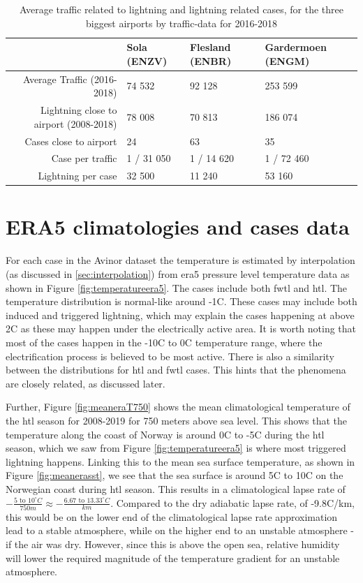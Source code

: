\begin{table}
        \begin{tabular}{r|l|l|l|}
            & Sola (ENZV) & Flesland (ENBR) & Gardermoen (ENGM) \\\hline
            Average Traffic (2016-2018)  & 74 532 & 92 128 & 253 599   \\\hline
            Lightning close to airport (2008-2018) & 78 008 & 70 813   & 186 074 \\\hline
            Cases close to airport & 24 & 63  & 35 \\\hline
            Case per traffic & 1 / 31 050 & 1 / 14 620 & 1 / 72 460\\\hline
            Lightning per case & 32 500 & 11 240 & 53 160 \\\hline
        \end{tabular}
     \caption{Average traffic related to lightning and lightning related cases, for the three biggest airports by traffic-data for 2016-2018}
     \label{tab:traffic}
\end{table}

\section{ERA5 climatologies and cases data}\label{sec:era5results}
For each case in the Avinor dataset the temperature is estimated by interpolation (as discussed in \ref{sec:interpolation}) from \acrshort{era5} pressure level temperature data as shown in Figure \ref{fig:temperatureera5}. The cases include both \acrshort{fwtl} and \acrshort{htl}. The temperature distribution is normal-like around -1C. These cases may include both induced and triggered lightning, which may explain the cases happening at above 2C as these may happen under the electrically active area. It is worth noting that most of the cases happen in the -10C to 0C temperature range, where the electrification process is believed to be most active. There is also a similarity between the distributions for \acrshort{htl} and \acrshort{fwtl} cases. This hints that the phenomena are closely related, as discussed later.

Further, Figure \ref{fig:meaneraT750} shows the mean climatological temperature of the \acrshort{htl} season for 2008-2019 for 750 meters above sea level. This shows that the temperature along the coast of Norway is around 0C to -5C during the \acrshort{htl} season, which we saw from Figure \ref{fig:temperatureera5} is where most triggered lightning happens. Linking this to the mean sea surface temperature, as shown in Figure \ref{fig:meanerasst}, we see that the sea surface is around 5C to 10C on the Norwegian coast during \acrshort{htl} season. This results in a climatological lapse rate of $-\frac{5 \text{ to } 10 ^{\circ}C}{750m} \approx -\frac{6.67 \text{ to }13.33 ^{\circ}C}{km}$. Compared to the dry adiabatic lapse rate, of -9.8C/km, this would be on the lower end of the climatological lapse rate approximation lead to a stable atmosphere, while on the higher end to an unstable atmosphere - if the air was dry. However, since this is above the open sea, relative humidity will lower the required magnitude of the temperature gradient for an unstable atmosphere. 

